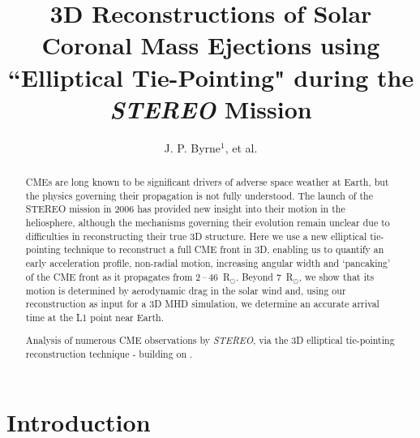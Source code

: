 \documentclass[preprint2]{aastex}
\begin{document}
\title{3D Reconstructions of Solar Coronal Mass Ejections using ``Elliptical Tie-Pointing" during the \emph{STEREO} Mission}

\author{J. P. Byrne$^{1}$, et al.} %


\begin{abstract}

CMEs are long known to be significant drivers of adverse space weather at Earth, but the physics governing their propagation is not fully understood. The launch of the STEREO mission in 2006 has provided new insight into their motion in the heliosphere, although the mechanisms governing their evolution remain unclear due to difficulties in reconstructing their true 3D structure. Here we use a new elliptical tie-pointing technique to reconstruct a full CME front in 3D, enabling us to quantify an early acceleration profile, non-radial motion, increasing angular width and `pancaking' of the CME front as it propagates from 2\,--\,46~R$_{\odot}$. Beyond 7~R$_{\odot}$, we show that its motion is determined by aerodynamic drag in the solar wind and, using our reconstruction as input for a 3D MHD simulation, we determine an accurate arrival time at the L1 point near Earth.

Analysis of numerous CME observations by \emph{STEREO}, via the 3D elliptical tie-pointing reconstruction technique - building on \citet{2010NatCo...1E..74B}.
\end{abstract}



\section{Introduction}
\end{document}
